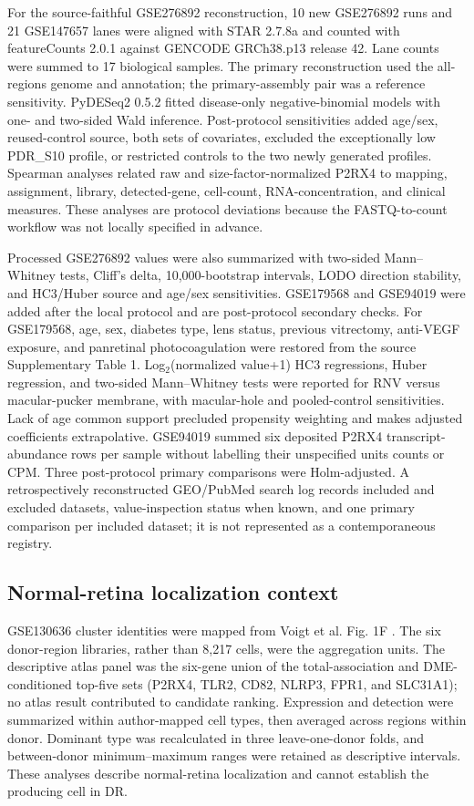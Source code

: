 \documentclass[12pt]{article}
\begin{document}
For the source-faithful GSE276892 reconstruction, 10 new GSE276892 runs and 21 GSE147657 lanes were aligned with STAR 2.7.8a and counted with featureCounts 2.0.1 against GENCODE GRCh38.p13 release 42. Lane counts were summed to 17 biological samples. The primary reconstruction used the all-regions genome and annotation; the primary-assembly pair was a reference sensitivity. PyDESeq2 0.5.2 fitted disease-only negative-binomial models with one- and two-sided Wald inference. Post-protocol sensitivities added age/sex, reused-control source, both sets of covariates, excluded the exceptionally low PDR\_S10 profile, or restricted controls to the two newly generated profiles. Spearman analyses related raw and size-factor-normalized P2RX4 to mapping, assignment, library, detected-gene, cell-count, RNA-concentration, and clinical measures. These analyses are protocol deviations because the FASTQ-to-count workflow was not locally specified in advance.

Processed GSE276892 values were also summarized with two-sided Mann--Whitney tests, Cliff's delta, 10,000-bootstrap intervals, LODO direction stability, and HC3/Huber source and age/sex sensitivities. GSE179568 and GSE94019 were added after the local protocol and are post-protocol secondary checks. For GSE179568, age, sex, diabetes type, lens status, previous vitrectomy, anti-VEGF exposure, and panretinal photocoagulation were restored from the source Supplementary Table 1. Log$_2$(normalized value+1) HC3 regressions, Huber regression, and two-sided Mann--Whitney tests were reported for RNV versus macular-pucker membrane, with macular-hole and pooled-control sensitivities. Lack of age common support precluded propensity weighting and makes adjusted coefficients extrapolative. GSE94019 summed six deposited P2RX4 transcript-abundance rows per sample without labelling their unspecified units counts or CPM. Three post-protocol primary comparisons were Holm-adjusted. A retrospectively reconstructed GEO/PubMed search log records included and excluded datasets, value-inspection status when known, and one primary comparison per included dataset; it is not represented as a contemporaneous registry.

\subsection{Normal-retina localization context}

GSE130636 cluster identities were mapped from Voigt et al. Fig. 1F \citep{Voigt2019}. The six donor-region libraries, rather than 8,217 cells, were the aggregation units. The descriptive atlas panel was the six-gene union of the total-association and DME-conditioned top-five sets (P2RX4, TLR2, CD82, NLRP3, FPR1, and SLC31A1); no atlas result contributed to candidate ranking. Expression and detection were summarized within author-mapped cell types, then averaged across regions within donor. Dominant type was recalculated in three leave-one-donor folds, and between-donor minimum--maximum ranges were retained as descriptive intervals. These analyses describe normal-retina localization and cannot establish the producing cell in DR.
\end{document}
